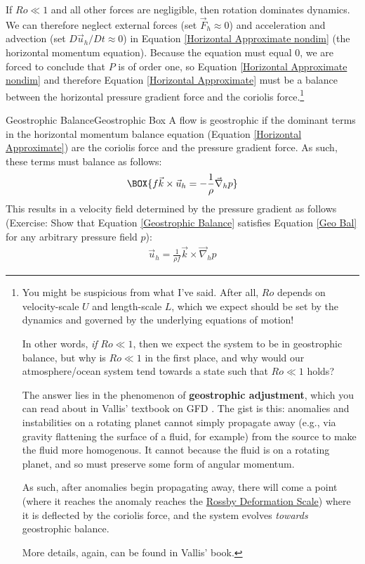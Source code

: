 If $Ro\ll 1$ and all other forces are negligible, then rotation dominates dynamics. We can therefore neglect external forces (set $\vec{F}_h\approx0$) and acceleration and advection (set $D\vec{u}_h/Dt\approx0$) in Equation \ref{Horizontal Approximate nondim} (the horizontal momentum equation). Because the equation must equal $0$, we are forced to conclude that $P$ is of order one, so Equation \ref{Horizontal Approximate nondim} and therefore Equation \ref{Horizontal Approximate} must be a balance between the horizontal pressure gradient force and the coriolis force.\footnote{
    You might be suspicious from what I've said. After all, $Ro$ depends on velocity-scale $U$ and length-scale $L$, which we expect should be set by the dynamics and governed by the underlying equations of motion!

    In other words, \textit{if} $Ro\ll 1$, then we expect the system to be in geostrophic balance, but why is $Ro\ll 1$ in the first place, and why would our atmosphere/ocean system tend towards a state such that $Ro\ll 1$ holds?

    The answer lies in the phenomenon of \textbf{geostrophic adjustment}, which you can read about in Vallis' textbook on GFD \cite{Vallis}. The gist is this: anomalies and instabilities on a rotating planet cannot simply propagate away (e.g., via gravity flattening the surface of a fluid, for example) from the source to make the fluid more homogenous. It cannot because the fluid is on a rotating planet, and so must preserve some form of angular momentum.

    As such, after anomalies begin propagating away, there will come a point (where it reaches the anomaly reaches the \hyperref[SW Def Radius Box]{Rossby Deformation Scale}) where it is deflected by the coriolis force, and the system evolves \textit{towards} geostrophic balance.

    More details, again, can be found in Vallis' book.
} 

\begin{fact}{Geostrophic Balance}{Geostrophic Box}\label{Geostrophic Box}
    A flow is geostrophic if the dominant terms in the horizontal momentum balance equation (Equation \ref{Horizontal Approximate}) are the coriolis force and the pressure gradient force. As such, these terms must balance as follows:
    \begin{align}
        \label{Geo Bal}
        \BOX{f\vec{k}\times\vec{u}_h=-\frac{1}{\rho}\vec{\nabla}_hp}
    \end{align}
    This results in a velocity field determined by the pressure gradient as follows (Exercise: Show that Equation \ref{Geostrophic Balance} satisfies Equation \ref{Geo Bal} for any arbitrary pressure field $p$):
    \begin{align}\label{Geostrophic Balance}
        \boxed{\vec{u}_h=\frac{1}{\rho f}\vec{k}\times\vec{\nabla}_hp}
    \end{align}
\end{fact}

